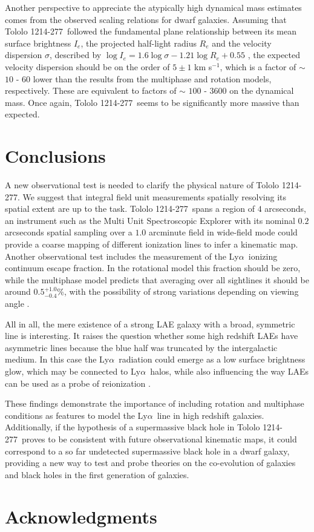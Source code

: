 \documentclass[a4,useAMS,usenatbib,usegraphicx]{mn2e}
\newcommand{\tol}{Tololo 1214-277}
\newcommand{\lya}{Ly$\alpha$}
\newcommand{\kms}{km s$^{-1}$}
\begin{document}
Another perspective to appreciate the atypically high dynamical mass
estimates comes from the observed scaling relations for dwarf
galaxies.
Assuming that \tol\ followed the fundamental plane relationship
between its mean surface brightness $I_e$, the projected half-light
radius $R_e$ and the velocity dispersion $\sigma$, described by $\log
I_e=1.6 \log\sigma - 1.21\log R_e + 0.55$ \citep{2009ApJ...698.1590G},
the expected velocity dispersion should be on the order of $5 \pm 1$ 
\kms, which is a factor of $\sim$ $10$ - $60$ lower than the 
results from the multiphase and rotation models, respectively. 
These are equivalent to factors of $\sim$ $100$ - $3600$ on the
dynamical mass.
Once again,  \tol\ seems to be significantly more massive than
expected. 



\section{Conclusions}

A new observational test is needed to clarify the physical nature of
\tol. 
We suggest that integral field unit measurements spatially
resolving its spatial extent are up to the task. 
\tol\ spans a region of $4$ arcseconds,
an instrument such as the Multi Unit Spectroscopic Explorer
\citep{2014Msngr.157...13B} with its
nominal $0.2$ arcseconds spatial sampling over a $1.0$ arcminute field
in wide-field mode could provide a coarse mapping of different
ionization lines to infer a kinematic map.
Another observational test includes the measurement of the
\lya\ ionizing continuum escape fraction.
In the rotational model this fraction should be zero, while
the multiphase model predicts that averaging over all sightlines
it should be around $0.5^{+1.0}_{-0.4}$\%, with the possibility of strong
variations depending on viewing angle \citep{2014MNRAS.444.1095G}. 

All in all, the mere existence of a strong LAE galaxy with a broad,
symmetric line is interesting.
It raises the question whether some high redshift LAEs have asymmetric
lines because the blue half was truncated by the intergalactic medium.
In this case the \lya\ radiation could emerge as a low surface
brightness glow, which may be connected to \lya\ halos, while also
influencing the way LAEs can be used as a probe of reionization
\citep{2014PASA...31...40D}.  

These findings demonstrate the importance of including rotation and multiphase
conditions as features to model the \lya\ line in high redshift
galaxies.
Additionally, if the hypothesis of a supermassive black
hole in \tol\ proves to be consistent with future observational
kinematic maps, it could correspond to a so far undetected
supermassive black hole in a dwarf galaxy, providing a new way to test
and probe theories on the co-evolution of galaxies and black holes in
the first generation of galaxies.   



\section*{Acknowledgments}



\end{document}
